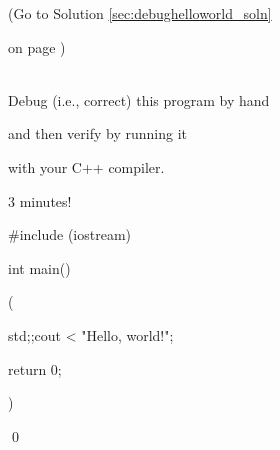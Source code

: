 \label{sec:debughelloworld}

(Go to Solution \ref{sec:debughelloworld_soln} 

on page \pageref{sec:debughelloworld_soln}) 

\\

Debug (i.e., correct) this program by hand 

and then verify by running it 

with your C++ compiler.

3 minutes!

\begin{console}

#include (iostream)



int main()

(

    std;;cout < "Hello, world!\n";



    return 0;

)

\end{console}

\qed


